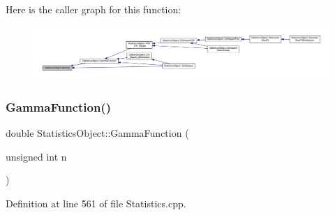 Here is the caller graph for this function\+:\nopagebreak
\begin{figure}[H]
\begin{center}
\leavevmode
\includegraphics[width=350pt]{class_statistics_object_a033c5346639a0dd44b68838a49bdd926_icgraph}
\end{center}
\end{figure}
\mbox{\label{class_statistics_object_a0d9dc9480288e61b3e98134deb18d2d4}} 
\subsubsection{\texorpdfstring{Gamma\+Function()}{GammaFunction()}}
{\footnotesize\ttfamily double Statistics\+Object\+::\+Gamma\+Function (\begin{DoxyParamCaption}\item[{unsigned int}]{n }\end{DoxyParamCaption})\hspace{0.3cm}{\ttfamily [protected]}}



Definition at line 561 of file Statistics.\+cpp.

